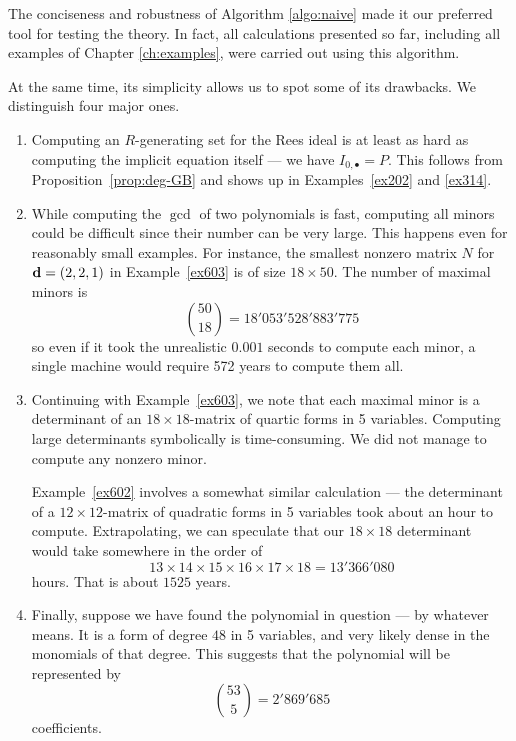 \documentclass[fleqn,reqno]{amsart}
\begin{document}
\begin{paragraf}
\label{par:flaws}
The conciseness and robustness of Algorithm \ref{algo:naive} made it our preferred tool
for testing the theory.
In fact, all calculations presented so far,
including all examples of Chapter \ref{ch:examples},
were carried out using this algorithm.

At the same time, its simplicity allows us to spot some of its drawbacks.
We distinguish four major ones.
\begin{enumerate}
\item
\label{itm:flaws:GB}
Computing an $R$-generating set for the Rees ideal is at least as hard as
computing the implicit equation itself --- we have $I_{0,\bullet}=P$.
This follows from Proposition~\ref{prop:deg-GB} and
shows up in Examples~\ref{ex202} and \ref{ex314}.

\item
\label{itm:flaws:many-minors}
While computing the $\gcd$ of two polynomials is fast,
computing all minors could be difficult since their number can be very large.
This happens even for reasonably small examples.
For instance, the smallest nonzero matrix $N$ for $\mathbf d=(2,2,1)$ in Example~\ref{ex603}
is of size $18\times50$.
The number of maximal minors is
\[
	\binom{50}{18}=18'053'528'883'775
\]
so even if it took the unrealistic $0.001$ seconds to compute each minor,
a single machine would require 572 years to compute them all.

\item
\label{itm:flaws:large-det}
Continuing with Example~\ref{ex603},
we note that each maximal minor is a determinant of an $18\times18$-matrix
of quartic forms in 5 variables.
Computing large determinants symbolically is time-consuming.
We did not manage to compute any nonzero minor.

Example~\ref{ex602} involves a somewhat similar calculation ---
the determinant of a $12\times12$-matrix of quadratic forms in 5 variables
took about an hour to compute.
Extrapolating, we can speculate that our $18\times18$ determinant would take somewhere
in the order of
\[
	13\times14\times15\times16\times17\times18=13'366'080
\]
hours.
That is about $1525$ years.

\item
\label{itm:flaws:large-poly}
Finally, suppose we have found the polynomial in question --- by whatever means.
It is a form of degree $48$ in 5 variables, and very likely dense in the monomials of that degree.
This suggests that the polynomial will be represented by
\[
	\binom{53}{5}=2'869'685
\]
coefficients.
\end{enumerate}
\end{paragraf}
\end{document}
